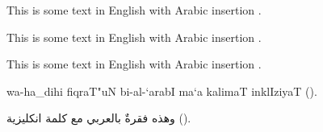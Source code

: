 \documentclass{minimal}
\begin{document}
This is some text in English with Arabic insertion .

This is some text in English with Arabic insertion .

This is some text in English with Arabic insertion .

\begin{arab}
wa-ha_dihi fiqraT"uN bi-al-`arabI ma`a kalimaT inklIziyaT ().
\end{arab}

\begin{arab}[utf]
وهذه فقرةٌ بالعربي مع كلمة انكليزية ().
\end{arab}
\end{document}
